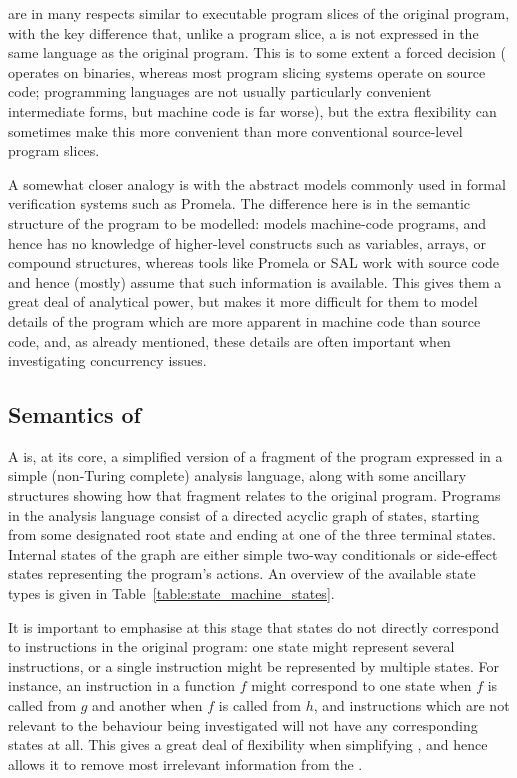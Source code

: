 {\STateMachines} are in many respects similar to executable program
slices of the original program, with the key difference that, unlike a
program slice, a {\StateMachine} is not expressed in the same language
as the original program.  This is to some extent a forced decision
({\technique} operates on binaries, whereas most program slicing
systems operate on source code; programming languages are not usually
particularly convenient intermediate forms, but machine code is far
worse), but the extra flexibility can sometimes make this more
convenient than more conventional source-level program
slices.

A somewhat closer analogy is with the abstract models commonly used in
formal verification systems such as Promela\needCite{}.  The
difference here is in the semantic structure of the program to be
modelled: {\technique} models machine-code programs, and hence has no
knowledge of higher-level constructs such as variables, arrays, or
compound structures, whereas tools like Promela or SAL\needCite{} work
with source code and hence (mostly) assume that such information is
available.  This gives them a great deal of analytical power, but
makes it more difficult for them to model details of the program which
are more apparent in machine code than source code, and, as already
mentioned, these details are often important when investigating
concurrency issues.


\subsection{Semantics of {\StateMachines}}

A {\StateMachine} is, at its core, a simplified version of a fragment
of the program expressed in a simple (non-Turing complete) analysis
language, along with some ancillary structures showing how that
fragment relates to the original program.  Programs in the analysis
language consist of a directed acyclic graph of states, starting from
some designated root state and ending at one of the three terminal
states.  Internal states of the graph are either simple two-way
conditionals or side-effect states representing the program's actions.
An overview of the available state types is given in
Table~\ref{table:state_machine_states}.

It is important to emphasise at this stage that {\StateMachines}
states do not directly correspond to instructions in the original
program: one state might represent several instructions, or a single
instruction might be represented by multiple states.  For instance, an
instruction in a function $f$ might correspond to one state when $f$
is called from $g$ and another when $f$ is called from $h$, and
instructions which are not relevant to the behaviour being
investigated will not have any corresponding states at all.  This
gives {\technique} a great deal of flexibility when simplifying
{\StateMachines}, and hence allows it to remove most irrelevant
information from the {\StateMachine}.

